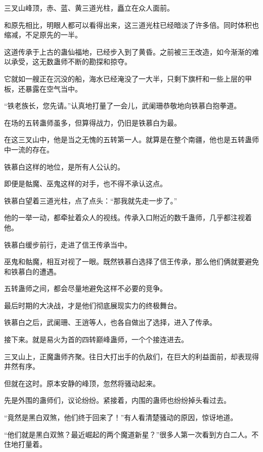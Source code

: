 
\begin{this_body}



三叉山峰顶，赤、蓝、黄三道光柱，矗立在众人面前。

和原先相比，明眼人都可以看得出来，这三道光柱已经暗淡了许多倍。同时体积也缩减，不足原先的一半。

这道传承于上古的蛊仙福地，已经步入到了黄昏。之前被三王改造，如今渐渐的难以承受，这无数蛊师不断的勘探和掠夺。

它就如一艘正在沉没的船，海水已经淹没了一大半，只剩下旗杆和一些上层的甲板，还暴露在空气当中。

“铁老族长，您先请。”认真地打量了一会儿，武阑珊恭敬地向铁慕白抱拳道。

在场的五转蛊师虽多，但算得战力，仍旧是铁慕白为最。

在这三叉山中，他是当之无愧的五转第一人。就算是在整个南疆，他也是五转蛊师中一流的存在。

铁慕白这样的地位，是所有人公认的。

即便是骷魔、巫鬼这样的对手，也不得不承认这点。

铁慕白望着三道光柱，点了点头：“那我就先走一步了。”

他的一举一动，都牵扯着众人的视线。传承入口附近的数千蛊师，几乎都注视着他。

铁慕白缓步前行，走进了信王传承当中。

巫鬼和骷魔，相互对视了一眼。既然铁慕白选择了信王传承，那么他们俩就要避免和铁慕白的遭遇。

五转蛊师之间，都会尽量地避免这样不必要的竞争。

最后时期的大决战，才是他们彻底展现实力的终极舞台。

铁慕白之后，武阑珊、王逍等人，也各自做出了选择，进入了传承。

接下来。就是易火为首的四转巅峰蛊师，一个个接连进去。

三叉山上，正魔蛊师齐聚。往日大打出手的仇敌们，在巨大的利益面前，却表现得井然有序。

但就在这时。原本安静的峰顶，忽然将骚动起来。

先是外围的蛊师们，议论纷纷。紧接着，内围的蛊师也纷纷掉头看过去。

“竟然是黑白双煞，他们终于回来了！”有人看清楚骚动的原因，惊讶地道。

“他们就是黑白双煞？最近崛起的两个魔道新星？”很多人第一次看到方白二人。不住地打量着。


\end{this_body}
